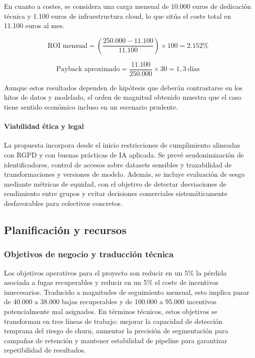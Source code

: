 \documentclass[12pt,a4paper]{article}
\begin{document}
En cuanto a costes, se considera una carga mensual de 10.000 euros de dedicación técnica y 1.100 euros de infraestructura cloud, lo que sitúa el coste total en 11.100 euros al mes.

\[
\text{ROI mensual} = \left(\frac{250.000 - 11.100}{11.100}\right)\times 100 = 2.152\%
\]

\[
\text{Payback aproximado} = \frac{11.100}{250.000}\times 30 = 1{,}3\ \text{días}
\]

Aunque estos resultados dependen de hipótesis que deberán contrastarse en los hitos de datos y modelado, el orden de magnitud obtenido muestra que el caso tiene sentido económico incluso en un escenario prudente.

\paragraph{Viabilidad ética y legal}

La propuesta incorpora desde el inicio restricciones de cumplimiento alineadas con RGPD y con buenas prácticas de IA aplicada. Se prevé seudonimización de identificadores, control de accesos sobre datasets sensibles y trazabilidad de transformaciones y versiones de modelo. Además, se incluye evaluación de sesgo mediante métricas de equidad, con el objetivo de detectar desviaciones de rendimiento entre grupos y evitar decisiones comerciales sistemáticamente desfavorables para colectivos concretos.

\subsection{Planificación y recursos}

\subsubsection{Objetivos de negocio y traducción técnica}

Los objetivos operativos para el proyecto son reducir en un 5\% la pérdida asociada a fugas recuperables y reducir en un 5\% el coste de incentivos innecesarios. Traducido a magnitudes de seguimiento mensual, esto implica pasar de 40.000 a 38.000 bajas recuperables y de 100.000 a 95.000 incentivos potencialmente mal asignados. En términos técnicos, estos objetivos se transforman en tres líneas de trabajo: mejorar la capacidad de detección temprana del riesgo de churn, aumentar la precisión de segmentación para campañas de retención y mantener estabilidad de pipeline para garantizar repetibilidad de resultados.
\end{document}
